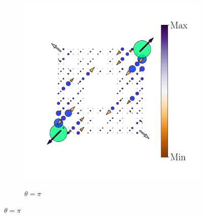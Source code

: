 \begin{figure}[h!]
\begin{minipage}[h!]{1.1\textwidth}
\begin{subfigure}[b!]{0.2 \textwidth}
             \label{}
         \end{subfigure}\hspace*{-0.5em}
          \begin{subfigure}[b!]{0.2 \textwidth}
             \caption*{$\theta = \pi$}
             \includegraphics[width=\textwidth]{Imagenes/Resultados_pump_Fractal/x/hoti_pomp_x_pos5.pdf}
             \label{}
         \end{subfigure}\hspace*{-0.5em}
     \end{minipage}\vspace*{-1em}
     

\end{figure}
